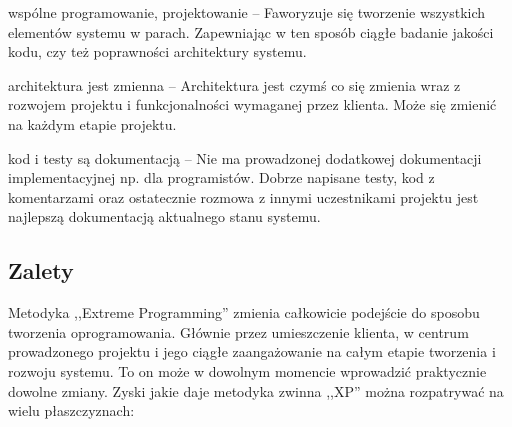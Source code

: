 \begin{packed_item}
    \item wspólne programowanie, projektowanie -- Faworyzuje się tworzenie wszystkich elementów systemu w parach. Zapewniając w ten sposób ciągłe badanie jakości kodu, czy też poprawności architektury systemu.
    \item architektura jest zmienna -- Architektura jest czymś co się zmienia wraz z rozwojem projektu i funkcjonalności wymaganej przez klienta. Może się zmienić na każdym etapie projektu.
    \item kod i testy są dokumentacją -- Nie ma prowadzonej dodatkowej dokumentacji implementacyjnej np. dla programistów. Dobrze napisane testy, kod z komentarzami oraz ostatecznie rozmowa z innymi uczestnikami projektu jest najlepszą dokumentacją aktualnego stanu systemu.
\end{packed_item}

\subsection{Zalety}
\label{sec:ZMTOzalety}

Metodyka ,,Extreme Programming'' zmienia całkowicie podejście do sposobu tworzenia oprogramowania. Głównie przez umieszczenie klienta, w centrum prowadzonego projektu i jego ciągłe zaangażowanie na całym etapie tworzenia i rozwoju systemu. To on może w dowolnym momencie wprowadzić praktycznie dowolne zmiany. Zyski jakie daje metodyka zwinna ,,XP'' można rozpatrywać na wielu płaszczyznach:

